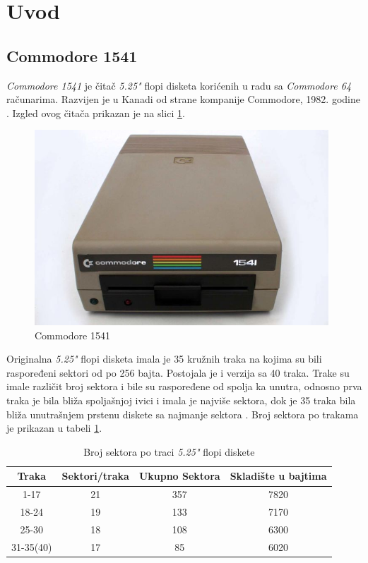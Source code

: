 \section{Uvod}

\subsection{Commodore 1541}
\textit{Commodore 1541} je čitač \textit{5.25"} flopi disketa korićenih u radu sa \textit{Commodore 64} računarima. Razvijen je u Kanadi od strane kompanije Commodore, 1982. godine \cite{Commodore1541Text}. Izgled ovog čitača prikazan je na slici \ref{img:commodore1541}.
\begin{figure}[ht]
\begin{center}
\includegraphics[width=11cm]{img/Commodore1541.jpg}
\caption[Commodore 1541 \textit{(preuzeto \cite{Commodore1541})}]{Commodore 1541}
\label{img:commodore1541}
\end{center}
\end{figure}

Originalna \textit{5.25"} flopi disketa imala je 35 kružnih traka na kojima su bili raspoređeni sektori od po 256 bajta. Postojala je i verzija sa 40 traka. Trake su imale različit broj sektora i bile su raspoređene od spolja ka unutra, odnosno prva traka je bila bliža spoljašnjoj ivici i imala je najviše sektora, dok je 35 traka bila bliža unutrašnjem prstenu diskete sa najmanje sektora \cite{D64}. Broj sektora po trakama je prikazan u tabeli \ref{tab:sektor_traka}.
\begin{table}[h!]
\begin{center}
\begin{tabular}{ | c | c| c | c | } 
\hline
Traka & Sektori/traka & Ukupno Sektora & Skladište u bajtima \\
\hline
\hline
1-17 & 21 & 357 & 7820 \\
\hline
18-24 & 19 & 133 & 7170 \\
\hline
25-30 & 18 & 108 & 6300 \\
\hline
31-35(40) & 17 & 85 & 6020 \\
\hline
\end{tabular}
\end{center}
\caption{Broj sektora po traci \textit{5.25"} flopi diskete}
\label{tab:sektor_traka}
\end{table}

